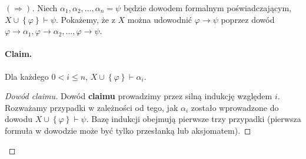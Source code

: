 \begin{proof}[\( (\Rightarrow) \)]
    Niech \( \alpha_1, \alpha_2, \ldots, \alpha_n = \psi \) będzie dowodem formalnym poświadczającym, \( X \cup \left\{ \varphi \right\} \vdash \psi \). Pokażemy, że z \( X \) można udowodnić \( \varphi \to \psi \) poprzez dowód \( \varphi \to \alpha_1, \varphi \to \alpha_2, \ldots, \varphi \to \psi \).

    \paragraph{Claim.} Dla każdego \( 0 < i \leqslant n \), \( X \cup \left\{ \varphi \right\} \vdash \alpha_i \).

\begin{proof}[Dowód claimu]
    Dowód \textbf{claimu} prowadzimy przez silną indukcję względem \( i \). Rozważamy przypadki w zależności od tego, jak \( \alpha_i \) zostało wprowadzone do dowodu \( X \cup \left\{ \varphi \right\} \vdash \psi\). Bazę indukcji obejmują pierwsze trzy przypadki (pierwsza formuła w dowodzie może być tylko przesłanką lub aksjomatem).


\end{proof}
\end{proof}
